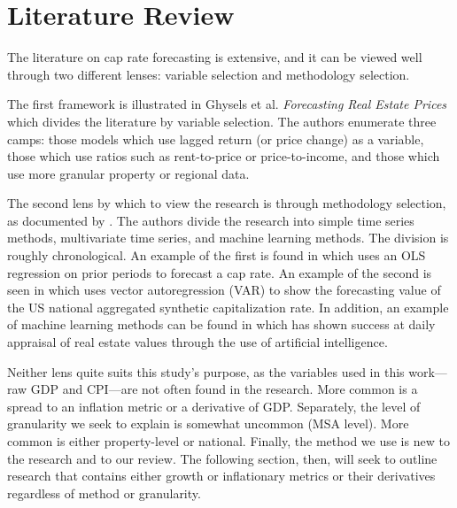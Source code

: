 \documentclass[jrfm,article,accept,oneauthor,pdftex]{Definitions/mdpi}
\begin{document}
\section{Literature Review}

The literature on cap rate forecasting is extensive, and it can be viewed well through two different lenses: variable selection and methodology selection. 

The first framework is illustrated in Ghysels et  al. \textit{Forecasting Real Estate Prices} \citep{ghysels_plazzi_valkanov_torous_2013} which divides the literature by variable selection. The authors enumerate three camps: those models which use lagged return (or price change) as a variable, those which use ratios such as rent-to-price or price-to-income, and those which use more granular property or regional data. 

The second lens by which to view the research is through methodology selection, as documented by  \cite{larriva2021determinants}. The authors divide the research into simple time series methods, multivariate time series, and machine learning methods. The division is roughly chronological. An example of the first is found in \cite{letdin2022role} which uses an OLS regression on prior periods to forecast a cap rate. An example of the second is seen in \cite{christopoulos2022national} which uses vector autoregression (VAR) to show the forecasting value of the US national aggregated synthetic capitalization rate. In addition, an example of machine learning methods can be found in \cite{francke2021daily} which has shown success at daily appraisal of real estate values through the use of artificial intelligence.

Neither lens quite suits this study's purpose, as the variables used in this work---raw GDP and CPI---are not often found in the research. More common is a spread to an inflation metric or a derivative of GDP. Separately, the level of granularity we seek to explain is somewhat uncommon (MSA level). More common is either property-level or national. Finally, the method we use is new to the research and to our review. The following section, then, will seek to outline research that contains either growth or inflationary metrics or their derivatives regardless of method or granularity.
\end{document}
